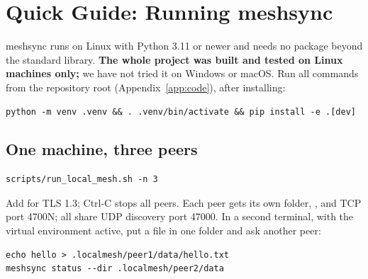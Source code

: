 \section[\texorpdfstring{\protect\fbox{\strut Quick Guide: Running meshsync}\protect\hspace{6pt}%
 \protect\colorbox{black}{\protect\color{white}\protect\bfseries\ START HERE\ }}{Quick Guide: Running meshsync}]{Quick Guide: Running meshsync}
\label{app:run}

meshsync runs on Linux with Python 3.11 or newer and needs no package beyond the standard library.
\textbf{The whole project was built and tested on Linux machines only;} we have not tried it on
Windows or macOS. Run all commands from the repository root (Appendix~\ref{app:code}), after
installing:
\begin{Verbatim}[frame=single,fontsize=\small]
python -m venv .venv && . .venv/bin/activate && pip install -e .[dev]
\end{Verbatim}

\subsection{One machine, three peers}
\begin{Verbatim}[frame=single,fontsize=\small]
scripts/run_local_mesh.sh -n 3
\end{Verbatim}
Add  for TLS 1.3; Ctrl-C stops all peers. Each peer gets its own folder,
, and TCP port 4700N; all share UDP discovery port 47000. In a second
terminal, with the virtual environment active, put a file in one folder and ask another peer:
\begin{Verbatim}[frame=single,fontsize=\small]
echo hello > .localmesh/peer1/data/hello.txt
meshsync status --dir .localmesh/peer2/data
\end{Verbatim}

